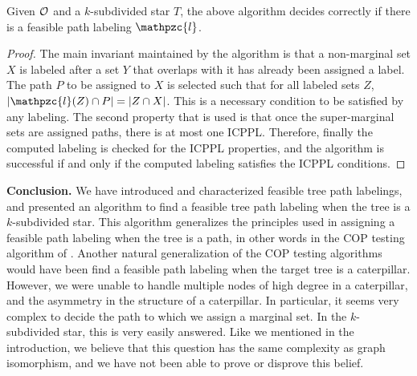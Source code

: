 \documentclass[envcountsect, envcountsame, 11pt]{../lib/llncs2e/llncs}
\def\cF{{\cal F}}
\def\cO{{\cal O}}
\def\cl{\mathpzc{l}}
\begin{document}
\begin{theorem}
  Given $\cO$ and a $k$-subdivided star $T$, the above algorithm
  decides correctly if there is a feasible path labeling $\cl$.
\end{theorem}
\begin{proof}
The main invariant maintained by the algorithm is that a non-marginal set $X$ is labeled after a set $Y$ that overlaps with it
has already been assigned a label.  The path $P$ to be assigned to $X$ is selected such that for all labeled sets $Z$,
$|\cl(Z) \cap P| = |Z \cap X|$.  This is a necessary condition to be satisfied by any labeling.  The second property that is used 
is that once the super-marginal sets are assigned paths, there is at most one ICPPL.  Therefore, finally the computed labeling
is checked for the ICPPL properties, and the algorithm is successful if and only if the computed labeling satisfies the ICPPL
conditions. 
\end{proof}
{\bf Conclusion.} We have  introduced and characterized feasible tree path labelings, and presented an algorithm to 
find a feasible tree path labeling when the tree is a $k$-subdivided star.  This algorithm generalizes the principles used in assigning
 a feasible path labeling when the tree is a path, in other words in the COP testing algorithm of \cite{nsnrs09,kklv10}.  
Another natural generalization of the COP testing algorithms would have been find a feasible path labeling when the target tree is a
caterpillar. However, we were unable to handle multiple nodes of high degree in a caterpillar, and the asymmetry in the structure of 
a caterpillar.   In particular, it seems very complex to decide the path to which we assign a marginal set.  In the $k$-subdivided star, this
is very easily answered.  Like we mentioned in the introduction, we believe that this question has the same complexity as graph isomorphism, and
we have not been able to prove or disprove this belief.
\end{document}
